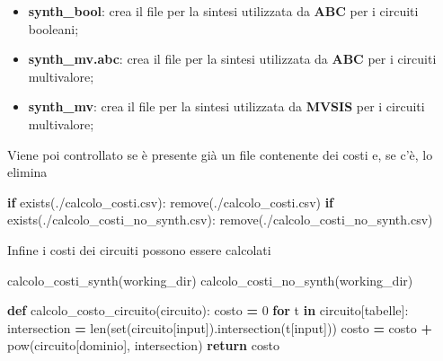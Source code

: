\documentclass[
  italian,
]{book}
\newenvironment{Shaded}{\begin{snugshade}}{\end{snugshade}}
\newcommand{\BuiltInTok}[1]{#1}
\newcommand{\ControlFlowTok}[1]{\textcolor[rgb]{0.13,0.29,0.53}{\textbf{#1}}}
\newcommand{\DecValTok}[1]{\textcolor[rgb]{0.00,0.00,0.81}{#1}}
\newcommand{\KeywordTok}[1]{\textcolor[rgb]{0.13,0.29,0.53}{\textbf{#1}}}
\newcommand{\NormalTok}[1]{#1}
\newcommand{\OperatorTok}[1]{\textcolor[rgb]{0.81,0.36,0.00}{\textbf{#1}}}
\newcommand{\StringTok}[1]{\textcolor[rgb]{0.31,0.60,0.02}{#1}}
\providecommand{\tightlist}{%
  \setlength{\itemsep}{0pt}\setlength{\parskip}{0pt}}
\begin{document}
\begin{itemize}
\tightlist
\item
  \textbf{synth\_bool}: crea il file per la sintesi utilizzata da \textbf{ABC} per i circuiti booleani;
\item
  \textbf{synth\_mv.abc}: crea il file per la sintesi utilizzata da \textbf{ABC} per i circuiti multivalore;
\item
  \textbf{synth\_mv}: crea il file per la sintesi utilizzata da \textbf{MVSIS} per i circuiti multivalore;
\end{itemize}

\newpage

Viene poi controllato se è presente già un file contenente dei costi e, se c'è, lo elimina

\begin{Shaded}
\begin{Highlighting}[]
\ControlFlowTok{if}\NormalTok{ exists(}\StringTok{\textquotesingle{}./calcolo\_costi.csv\textquotesingle{}}\NormalTok{):}
\NormalTok{    remove(}\StringTok{\textquotesingle{}./calcolo\_costi.csv\textquotesingle{}}\NormalTok{)}
\ControlFlowTok{if}\NormalTok{ exists(}\StringTok{\textquotesingle{}./calcolo\_costi\_no\_synth.csv\textquotesingle{}}\NormalTok{):}
\NormalTok{    remove(}\StringTok{\textquotesingle{}./calcolo\_costi\_no\_synth.csv\textquotesingle{}}\NormalTok{)}
\end{Highlighting}
\end{Shaded}

Infine i costi dei circuiti possono essere calcolati

\begin{Shaded}
\begin{Highlighting}[]
\NormalTok{calcolo\_costi\_synth(working\_dir)}
\NormalTok{calcolo\_costi\_no\_synth(working\_dir)}

\KeywordTok{def}\NormalTok{ calcolo\_costo\_circuito(circuito):}
\NormalTok{  costo }\OperatorTok{=} \DecValTok{0}
  \ControlFlowTok{for}\NormalTok{ t }\KeywordTok{in}\NormalTok{ circuito[}\StringTok{\textquotesingle{}tabelle\textquotesingle{}}\NormalTok{]:}
\NormalTok{    intersection }\OperatorTok{=} \BuiltInTok{len}\NormalTok{(}\BuiltInTok{set}\NormalTok{(circuito[}\StringTok{\textquotesingle{}input\textquotesingle{}}\NormalTok{]).intersection(t[}\StringTok{\textquotesingle{}input\textquotesingle{}}\NormalTok{]))}
\NormalTok{    costo }\OperatorTok{=}\NormalTok{ costo }\OperatorTok{+} \BuiltInTok{pow}\NormalTok{(circuito[}\StringTok{\textquotesingle{}dominio\textquotesingle{}}\NormalTok{], intersection)}
  \ControlFlowTok{return}\NormalTok{ costo}
\end{Highlighting}
\end{Shaded}
\end{document}

